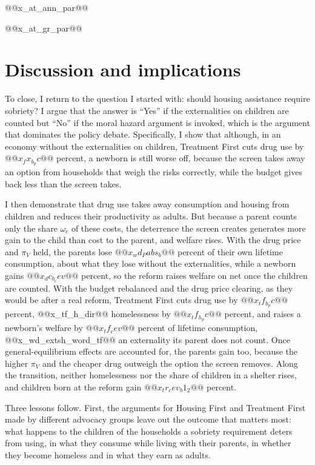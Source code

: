 \documentclass[10pt]{article}
\begin{document}
@@x_at_ann_par@@

@@x_at_gr_par@@

\section{Discussion and implications}\label{sec:discussion}

To close, I return to the question I started with: should housing assistance require sobriety?   I argue that the answer is  ``Yes'' if the externalities on children are counted but ``No'' if the moral hazard argument is invoked, which is the argument that dominates the policy debate.   Specifically, I show that although, in an economy without the externalities on children, Treatment First cuts drug use by $@@x_fx_b_pc@@$ percent, a newborn is still worse off, because the screen takes away an option from households that weigh the risks correctly, while the budget gives back less than the screen takes.

 I  then demonstrate that drug use takes away consumption and housing from children and reduces their productivity as adults.  But because a parent counts only the share $\omega_c$ of these costs, the deterrence the screen creates generates more gain to the child than cost to the parent, and welfare rises. With the drug price and $\pi_V$ held, the parents lose $@@x_wd_Pabs_b@@$ percent of their own lifetime consumption, about what they lose without the externalities, while a newborn gains $@@x_dc_b_cev@@$ percent, so the reform raises welfare on net once the children are counted. With the budget rebalanced and the drug price clearing, as they would be after a real reform, Treatment First cuts drug use by $@@x_tf_b_pc@@$ percent, @@x_tf_h_dir@@ homelessness by $@@x_tf_h_pc@@$ percent, and raises a newborn's welfare by $@@x_tf_cev@@$ percent of lifetime consumption, @@x_wd_extsh_word_tf@@ an externality its parent does not count. Once general-equilibrium effects are accounted for, the parents gain too, because the higher $\pi_V$ and the cheaper drug outweigh the option the screen removes. Along the transition, neither homelessness nor the share of children in a shelter rises, and children born at the reform gain $@@x_tr_cev_b1_2@@$ percent.

Three lessons follow. First, the arguments for Housing First and Treatment First made by different advocacy
groups leave out the outcome that matters most: what happens to the children of the households a sobriety requirement deters from using, in what they consume while living with their parents, in whether they become homeless and in what they earn as adults.
\end{document}

